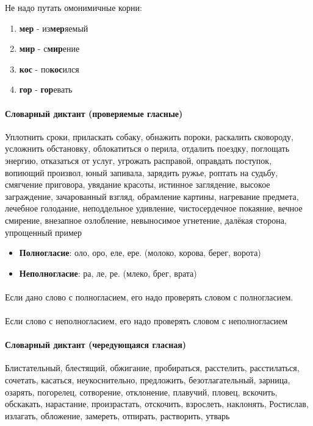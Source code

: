 \documentclass{article}
\begin{document}
Не надо путать омонимичные корни:

\begin{enumerate}
\item
  \textbf{мер} - из\textbf{мер}яемый
\item
  \textbf{мир} - с\textbf{мир}ение
\item
  \textbf{кос} - по\textbf{кос}ился
\item
  \textbf{гор} - \textbf{гор}евать
\end{enumerate}

\paragraph{Словарный диктант (проверяемые гласные)}

Уплотнить сроки, 
приласкать собаку, 
обнажить пороки, 
раскалить сковороду, 
усложнить обстановку, 
облокатиться о перила, 
отдалить поездку, 
поглощать энергию, 
отказаться от услуг, 
угрожать расправой,  
оправдать поступок, 
вопиющий произвол, 
юный запивала, 
зарядить ружье,
роптать на судьбу,
смягчение приговора,
увядание красоты,
истинное заглядение,
высокое заграждение,
зачарованный взгляд,
обрамление картины,
нагревание предмета,
лечебное голодание,
неподдельное удивление,
чистосердечное покаяние,
вечное смирение,
внезапное озлобление,
невыносимое угнетение,
далёкая сторона,
упрощенный пример

\begin{itemize}
\item
  \textbf{Полногласие}: оло, оро, еле, ере. (молоко, корова, берег, ворота)
\item
  \textbf{Неполногласие}: ра, ле, ре. (млеко, брег, врата)
\end{itemize}

\paragraph{}

Если дано слово с полногласием, его надо проверять словом с полногласием.
\paragraph{}
Если слово с неполногласием, его надо проверять словом с неполногласием

\paragraph{Словарный диктант (чередующаяся гласная)}
Блистательный, блестящий, обжигание, пробираться, расстелить, расстилаться, сочетать, касаться, неукоснительно,
предложить, безотлагательный, зарница, озарять, погорелец, сотворение, отклонение, плавучий, пловец, вскочить,
обскакать, нарастание, произрастать, отскочить, взрослеть, наклонять, Ростислав, излагать, обложение, замереть,
отпирать, растворить, утварь
\end{document}
